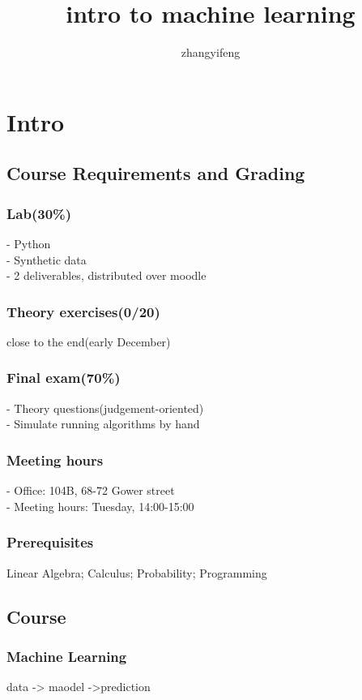 \documentclass{article}
\title{intro to machine learning}
\author{zhangyifeng}
\begin{document}
\maketitle
\tableofcontents
\section{Intro}
	\subsection{Course Requirements and Grading}
		\subsubsection*{Lab(30\%)}
			- Python\\
 			- Synthetic data\\
			- 2 deliverables, distributed over moodle

		\subsubsection*{Theory exercises(0/20)}
			close to the end(early December)

		\subsubsection*{Final exam(70\%)}
			- Theory questions(judgement-oriented)\\
			- Simulate running algorithms by hand

		\subsubsection*{Meeting hours}
			- Office: 104B, 68-72 Gower street\\
			- Meeting hours: Tuesday, 14:00-15:00

		\subsubsection*{Prerequisites}
			Linear Algebra; Calculus; Probability; Programming

	\subsection{Course}
		\subsubsection*{Machine Learning}
			data -> maodel ->prediction
\end{document}
